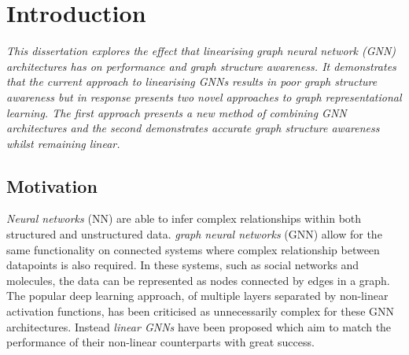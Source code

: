 \chapter{Introduction}


\emph{
    This dissertation explores the effect that linearising graph neural network (GNN) architectures has on performance and graph structure awareness.
    It demonstrates that the current approach to linearising GNNs results in poor graph structure awareness but in response presents two novel approaches to graph representational learning.
    The first approach presents a new method of combining GNN architectures and the second demonstrates accurate graph structure awareness whilst remaining linear.
}

\section{Motivation}
\label{sec:motivation}




\emph{Neural networks} (NN) are able to infer complex relationships within both structured and unstructured data.
\emph{graph neural networks} (GNN) allow for the same functionality on connected systems where complex relationship between datapoints is also required.
In these systems, such as social networks\cite{pmlr-v70-gilmer17a} and molecules\cite{DBLP:journals/corr/abs-1806-01973}, the data can be represented as nodes connected by edges in a graph.
The popular deep learning approach, of multiple layers separated by non-linear activation functions, has been criticised as unnecessarily complex for these GNN architectures.\cite{wu2019simplifying}
Instead \emph{linear GNNs} have been proposed\cite{chanpuriya2022simplified,navarin2020linear,wu2019simplifying} which aim to match the performance of their non-linear counterparts with great success.

